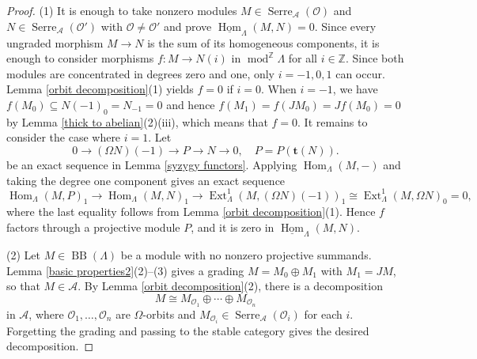 \documentclass{amsart}
\theoremstyle{definition}
\theoremstyle{remark}
\numberwithin{equation}{thm}
\def\A{\mathcal{A}}
\def\BB{\operatorname{BB}}
\def\Ext{\operatorname{Ext}}
\def\gmod{\operatorname{mod}^{\mathbb{Z}}\!}
\def\Hom{\operatorname{Hom}}
\def\L{\Lambda}
\def\O{\mathcal{O}}
\def\Serre{\operatorname{Serre}}
\def\Z{\mathbb{Z}}
\def\bft{\mathbf{t}}
\begin{document}
\begin{proof}
(1)   It is enough to take nonzero modules $M\in\Serre_{\A}(\O)$ and $N\in\Serre_{\A}(\O')$ with $\O\ne\O'$ and prove $\underline{\Hom}_\L(M,N)=0$. 
Since every ungraded morphism $M\to N$ is the sum of its homogeneous components, it is enough to consider morphisms $f:M\to N(i)$ in $\gmod\L$ for all $i\in\Z$. Since both modules are concentrated in degrees zero and one, only $i=-1,0,1$ can occur.
Lemma \ref{orbit decomposition}(1) yields $f=0$ if $i=0$.
When $i=-1$, we have $f(M_0)\subseteq N(-1)_0=N_{-1}=0$ and hence $f(M_1)=f(JM_0)=Jf(M_0)=0$ by Lemma \ref{thick to abelian}(2)(iii), which means that $f=0$.
It remains to consider the case where $i=1$. Let 
$$
0\to (\Omega N)(-1)\to P\to N\to0,
\quad
P=P(\bft(N)).
$$
be an exact sequence in Lemma \ref{syzygy functors}.
Applying $\Hom_\L(M,-)$ and taking the degree one component gives an exact sequence
$$
\Hom_\L(M,P)_1\to\Hom_\L(M,N)_1 \to\Ext_\L^1(M,(\Omega N)(-1))_1\cong\Ext_\L^1(M,\Omega N)_0=0,
$$
where the last equality follows from Lemma \ref{orbit decomposition}(1).
Hence $f$ factors through a projective module $P$, and it is zero in $\underline{\Hom}_\L(M,N)$.

(2) Let $M\in\BB(\L)$ be a module with no nonzero projective summands. Lemma \ref{basic properties2}(2)--(3) gives a grading $M=M_0\oplus M_1$ with $M_1=JM$, so that $M\in\A$. By Lemma \ref{orbit decomposition}(2), there is a decomposition
$$
M\cong M_{\O_1}\oplus\cdots\oplus M_{\O_n}
$$
in $\A$, where $\O_1,\ldots,\O_n$ are $\Omega$-orbits and $M_{\O_i}\in\Serre_{\A}(\O_i)$ for each $i$. Forgetting the grading and passing to the stable category gives the desired decomposition.


\end{proof}
\end{document}
